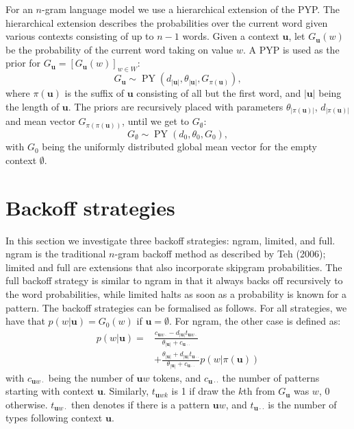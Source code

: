 For an $n$-gram language model we use a hierarchical extension of the PYP. The hierarchical extension describes the probabilities over the current word given various contexts consisting of up to $n-1$ words. Given a context $\mathbf{u}$, let $G_\mathbf{u}(w)$ be the probability of the current word taking on value $w$. A PYP is used as the prior for $G_\mathbf{u}=[G_\mathbf{u}(w)]_{w\in W}$: 
  \begin{equation*}
  	G_\mathbf{u}\sim\operatorname{PY}(d_{|\mathbf{u}|}, \theta_{|\mathbf{u}|},G_{\pi(\mathbf{u})}),
  \end{equation*}
where $\pi(\mathbf{u})$ is the suffix of $\mathbf{u}$ consisting of all but the first word, and $|\mathbf{u}|$ being the length of $\mathbf{u}$. The priors are recursively placed with parameters $\theta_{|\pi(\mathbf{u})|}$, $d_{|\pi(\mathbf{u})|}$ and mean vector $G_{\pi(\pi(\mathbf{u}))}$, until we get to $G_\emptyset$: 		\begin{equation*}
		G_\emptyset \sim\operatorname{PY}(d_0,\theta_0,G_0),
    \end{equation*}\vspace{-0.05cm}
with $G_0$ being the uniformly distributed global mean vector for the empty context $\emptyset$.

\section{Backoff strategies}

In this section we investigate three backoff strategies: {\sf ngram}, {\sf limited}, and {\sf full}. {\sf ngram} is the traditional $n$-gram backoff method as described by Teh (2006); {\sf limited} and {\sf full} are extensions that also incorporate skipgram probabilities. The {\sf full} backoff strategy is similar to {\sf ngram} in that it always backs off recursively to the word probabilities, while {\sf limited} halts as soon as a probability is known for a pattern. The backoff strategies can be formalised as follows.
%
For all strategies, we have that $p(w|\mathbf{u})=G_0(w)$ if $\mathbf{u} = \emptyset$. For {\sf ngram}, the other case is defined as:
  \begin{equation*}\begin{split}
  	p(w|\mathbf{u})= &
\frac{c_{\mathbf{u}w\cdot}-d_{|\mathbf{u}|}t_{\mathbf{u}w\cdot}}{\theta_{|\mathbf{u}|}+c_{\mathbf{u}\cdot\cdot}} \\
& +
\frac{\theta_{|\mathbf{u}|}+d_{|\mathbf{u}|}t_{\mathbf{u}\cdot\cdot}}{\theta_{|\mathbf{u}|}+c_{\mathbf{u}\cdot\cdot}}
p(w|\pi(\mathbf{u}))
  \end{split}\end{equation*}
with $c_{\mathbf{u}w\cdot}$ being the number of $\mathbf{u}w$ tokens, and $c_{\mathbf{u}\cdot\cdot}$ the number of patterns starting with context $\mathbf{u}$. Similarly, $t_{\mathbf{u}wk}$ is 1 if draw the $k$th from $G_{\mathbf{u}}$ was $w$, 0 otherwise. $t_{\mathbf{u}w\cdot}$ then denotes if there is a pattern $\mathbf{u}w$, and $t_{\mathbf{u}\cdot\cdot}$ is the number of types following context $\mathbf{u}$.
  
